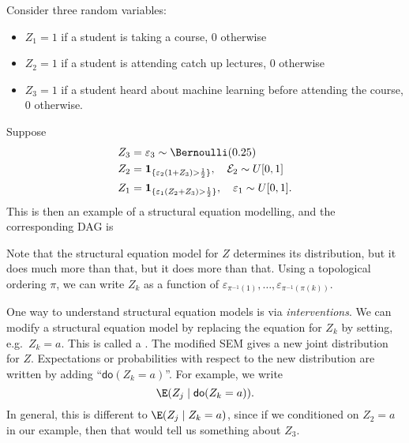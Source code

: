 \documentclass[a4paper]{article}
\newcommand\ddo{\mathsf{do}}
\begin{document}
\begin{eg}
  Consider three random variables:
  \begin{itemize}
    \item $Z_1 = 1$ if a student is taking a course, $0$ otherwise
    \item $Z_2 = 1$ if a student is attending catch up lectures, $0$ otherwise
    \item $Z_3 = 1$ if a student heard about machine learning before attending the course, $0$ otherwise.
  \end{itemize}
  Suppose
  \begin{align*}
    Z_3 &= \varepsilon_3 \sim \Bernoulli(0.25)\\
    Z_2 &= \mathbf{1}_{\{\varepsilon_2(1 + Z_3) > \frac{1}{2}\}},\quad \mathcal{E}_2 \sim U[0, 1]\\
    Z_1 &= \mathbf{1}_{\{\varepsilon_1(Z_2 + Z_3) > \frac{1}{2}\}},\quad \varepsilon_1 \sim U[0, 1].
  \end{align*}
  This is then an example of a structural equation modelling, and the corresponding DAG is
  \begin{center}
  \end{center}
\end{eg}
Note that the structural equation model for $Z$ determines its distribution, but it does much more than that, but it does more than that. Using a topological ordering $\pi$, we can write $Z_k$ as a function of $\varepsilon_{\pi^{-1}(1)}, \ldots, \varepsilon_{\pi^{-1}(\pi(k))}$.

One way to understand structural equation models is via \emph{interventions}. We can modify a structural equation model by replacing the equation for $Z_k$ by setting, e.g.\ $Z_k = a$. This is called a . The modified SEM gives a new joint distribution for $Z$. Expectations or probabilities with respect to the new distribution are written by adding ``$\ddo(Z_k = a)$''. For example, we write
\[
  \E(Z_j \mid \ddo(Z_k = a)).
\]
In general, this is different to $\E(Z_j \mid Z_k = a)$, since if we conditioned on $Z_2 = a$ in our example, then that would tell us something about $Z_3$.
\end{document}
